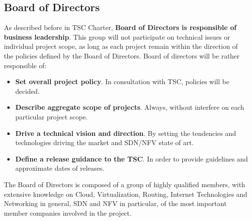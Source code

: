 \documentclass[a4paper, 12pt]{book}
\begin{document}
\subsection{Board of Directors}
As described before in TSC Charter, \textbf{Board of Directors is responsible of business leadership}. This group will not participate on technical issues or individual project scope, as long as each project remain within the direction of the policies defined by the Board of Directors. Board of directors will be rather responsible of:
\begin{itemize}\itemsep0pt
\item{\textbf{Set overall project policy}}. In consultation with TSC, policies will be decided.
\item{\textbf{Describe aggregate scope of projects}}. Always, without interfere on each particular project scope.
\item{\textbf{Drive a technical vision and direction}}. By setting the tendencies and technologies driving the market and SDN/NFV state of art.
\item{\textbf{Define a release guidance to the TSC}}. In order to provide guidelines and approximate dates of releases.
\end{itemize}
The Board of Directors is composed of a group of highly qualified members, with extensive knowledge on Cloud, Virtualization, Routing, Internet Technologies and Networking in general, SDN and NFV in particular, of the most important member companies involved in the project.
\end{document}
